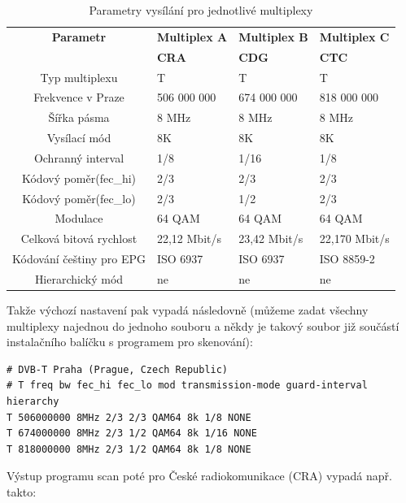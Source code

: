\begin{table}
\begin{center}
\begin{tabular}{|c|l|l|l|}
\hline
\bf{Parametr} 		& \bf{Multiplex A} 	& \bf{Multiplex B} 	& \bf{Multiplex C} 	\\
			& 	\bf{CRA} 	& 	\bf{CDG} 	& 	\bf{CTC} 	\\
\hline
Typ multiplexu		&	T		&       T		&       T		\\
\hline
Frekvence v Praze	&	506 000 000	&       674 000 000	&       818 000 000	\\
\hline
Šířka pásma		&	8 MHz		&       8 MHz		&       8 MHz		\\
\hline
Vysílací mód		&	8K		&       8K		&       8K		\\
\hline
Ochranný interval 	&	1/8		&       1/16		&       1/8		\\
\hline
Kódový poměr(fec\_hi)	&	2/3		&       2/3		&       2/3		\\
\hline
Kódový poměr(fec\_lo)	&	2/3		&       1/2		&       2/3		\\
\hline
Modulace		&	64 QAM		&       64 QAM		&       64 QAM		\\
\hline
Celková bitová rychlost	&	22,12 Mbit/s	&	23,42 Mbit/s	&	22,170 Mbit/s	\\
\hline
Kódování češtiny pro EPG&	ISO 6937	&	ISO 6937	&	ISO 8859-2	\\
\hline
Hierarchický mód 	&	ne		&       ne		&       ne		\\
\hline
\end{tabular}
\end{center}
\caption{Parametry vysílání pro jednotlivé multiplexy}
\label{tab:mplexy}
\end{table}

Takže výchozí nastavení pak vypadá následovně (můžeme zadat všechny multiplexy najednou do jednoho souboru a někdy je takový soubor již součástí instalačního balíčku s programem pro skenování):

\begin{small}
\begin{verbatim}
# DVB-T Praha (Prague, Czech Republic)
# T freq bw fec_hi fec_lo mod transmission-mode guard-interval hierarchy
T 506000000 8MHz 2/3 2/3 QAM64 8k 1/8 NONE
T 674000000 8MHz 2/3 1/2 QAM64 8k 1/16 NONE
T 818000000 8MHz 2/3 1/2 QAM64 8k 1/8 NONE
\end{verbatim}
\end{small}

Výstup programu scan poté pro České radiokomunikace (CRA) vypadá např. takto:
 
